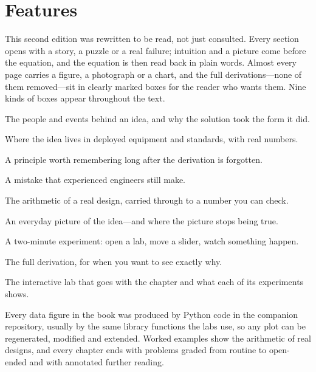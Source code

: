 \section*{Features}
This second edition was rewritten to be read, not just consulted. Every section opens with a
story, a puzzle or a real failure; intuition and a picture come before the equation, and the
equation is then read back in plain words. Almost every page carries a figure, a photograph or
a chart, and the full derivations---none of them removed---sit in clearly marked boxes for the
reader who wants them. Nine kinds of boxes appear throughout the text.
\begin{history}[]The people and events behind an idea, and why the solution took the form it did.\end{history}
\begin{inpractice}[]Where the idea lives in deployed equipment and standards, with real numbers.\end{inpractice}
\begin{keyidea}[]A principle worth remembering long after the derivation is forgotten.\end{keyidea}
\begin{pitfall}[]A mistake that experienced engineers still make.\end{pitfall}
\begin{worked}[]The arithmetic of a real design, carried through to a number you can check.\end{worked}
\begin{analogy}[]An everyday picture of the idea---and where the picture stops being true.\end{analogy}
\begin{tryit}[]A two-minute experiment: open a lab, move a slider, watch something happen.\end{tryit}
\begin{deeper}[]The full derivation, for when you want to see exactly why.\end{deeper}
\begin{labbox}[]The interactive lab that goes with the chapter and what each of its experiments shows.\end{labbox}
Every data figure in the book was produced by Python code in the companion repository,
usually by the same library functions the labs use, so any plot can be regenerated,
modified and extended. Worked examples show the arithmetic of real designs, and every
chapter ends with problems graded from routine to open-ended and with annotated further
reading.

